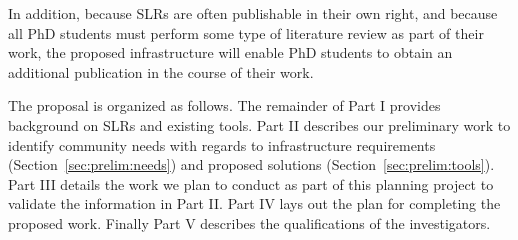 In addition, because SLRs are often publishable in their own right, and because all PhD students must perform some type of literature review as part of their work, the proposed infrastructure will enable PhD students to obtain an additional publication in the course of their work.

The proposal is organized as follows. The remainder of Part I provides background on SLRs and existing tools. Part II describes our preliminary work to identify community needs with regards to infrastructure requirements (Section~\ref{sec:prelim:needs}) and proposed solutions (Section~\ref{sec:prelim:tools}). Part III details the work we plan to conduct as part of this planning project to validate the information in Part II. Part IV lays out the plan for completing the proposed work. Finally Part V describes the qualifications of the investigators.

